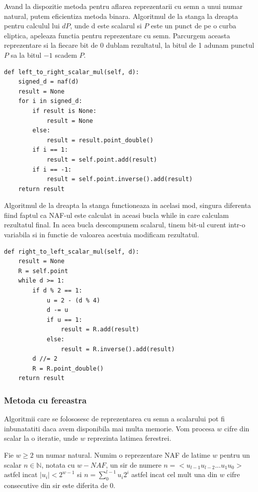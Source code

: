 Avand la dispozitie metoda pentru aflarea reprezentarii cu semn a unui numar natural, putem eficientiza metoda binara. Algoritmul de la stanga la dreapta pentru calculul lui $dP$, unde d este scalarul si $P$ este un punct de pe o curba eliptica, apeleaza functia pentru reprezentare cu semn. Parcurgem aceasta reprezentare si la fiecare bit de 0 dublam rezultatul, la bitul de 1 adunam punctul $P$ sa la bitul $-1$ scadem $P$.

\begin{lstlisting}
def left_to_right_scalar_mul(self, d):
    signed_d = naf(d)
    result = None
    for i in signed_d:
        if result is None:
            result = None
        else:
            result = result.point_double()
        if i == 1:
            result = self.point.add(result)
        if i == -1:
            result = self.point.inverse().add(result)
    return result
\end{lstlisting}

Algoritmul de la dreapta la stanga functioneaza in acelasi mod, singura diferenta fiind faptul ca NAF-ul este calculat in aceasi bucla while in care calculam rezultatul final. In acea bucla descompunem scalarul, tinem bit-ul curent intr-o variabila si in functie de valoarea acestuia modificam rezultatul. 

\begin{lstlisting}
def right_to_left_scalar_mul(self, d):
    result = None
    R = self.point
    while d >= 1:
        if d % 2 == 1:
            u = 2 - (d % 4)
            d -= u
            if u == 1:
                result = R.add(result)
            else:
                result = R.inverse().add(result)
        d //= 2
        R = R.point_double()
    return result
\end{lstlisting}

\subsubsection{Metoda cu fereastra}
Algoritmii care se folososesc de reprezentarea cu semn a scalarului pot fi inbunatatiti daca avem disponibila mai multa memorie. Vom procesa $w$ cifre din scalar la o iteratie, unde $w$ reprezinta latimea ferestrei.

\begin{dfn}
Fie $w\geq 2$ un numar natural. Numim o reprezentare NAF de latime $w$ pentru un scalar $n\in\mathbb{N}$, notata cu $w-NAF$, un sir de numere $n = <u_{l-1}u_{l-2}...u_1u_0>$ astfel incat $|u_i| < 2^{w-1}$ si $n = \sum_{0}^{l-1}u_i2^i$ astfel incat cel mult una din $w$ cifre consecutive din sir este diferita de 0.
\end{dfn}

